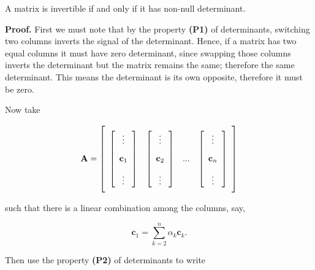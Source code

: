 \begin{theorem}\label{theo:nulldet} %
	A matrix is invertible if and only if it has non-null determinant. \end{theorem}
\noindent\textbf{Proof.} First we must note that by the property \textbf{(P1)} of determinants, switching two columns inverts the signal of the determinant. Hence, if a matrix has two equal columns it must have zero determinant, since swapping those columns inverts the determinant but the matrix remains the same; therefore the same determinant. This means the determinant is its own opposite, therefore it must be zero.

	Now take 

\begin{equation}
	\mathbf{A} = \left[\raisebox{15mm}{} \begin{array}{cccc} \left[\begin{array}{c} \vdots \\[3mm] \mathbf{c}_1 \\[3mm] \vdots \end{array}\right] & \left[\begin{array}{c} \vdots \\[3mm] \mathbf{c}_2 \\[3mm] \vdots \end{array}\right] & ... & \left[\begin{array}{c} \vdots \\[3mm] \mathbf{c}_n \\[3mm] \vdots \end{array}\right]\end{array}\right]
\end{equation}

	\noindent such that there is a linear combination among the columns, say,

\begin{equation} \mathbf{c}_1 = \sum\limits_{k=2}^n \alpha_k\mathbf{c}_k .\end{equation}

	Then use the property \textbf{(P2)} of determinants to write 

